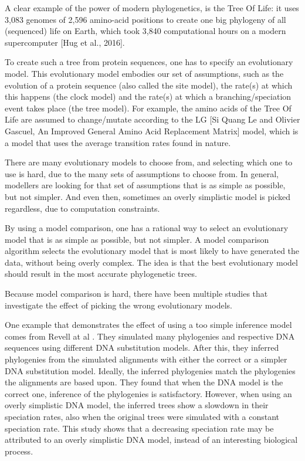 %
%

A clear example of the power of modern phylogenetics,
is the Tree Of Life: it uses 
3,083 genomes of 2,596 amino-acid positions 
to create one big phylogeny of all (sequenced) life on Earth,
which took 3,840 computational hours on a modern supercomputer [Hug et al., 2016].

%
%
%

To create such a tree from protein sequences, one has to specify
an evolutionary model. This evolutionary model embodies our set of
assumptions,
such as the evolution of a protein sequence (also called the site model), 
the rate(s) at which this happens (the clock model) 
and the rate(s) at which a branching/speciation event takes 
place (the tree model). 
For example, the amino acids of the Tree Of Life are assumed to change/mutate
according to the LG [Si Quang 
Le and Olivier Gascuel, An Improved General Amino Acid Replacement Matrix]
model, which is a model that uses the average transition rates found in nature.

There are many evolutionary models to choose from, 
and selecting which one to use is hard, due to the many sets of assumptions
to choose from. In general, modellers are looking for that set of assumptions
that is as simple as possible, but not simpler. And even then, sometimes
an overly simplistic model is picked regardless, due to computation 
constraints. 

By using a model comparison, one has a rational way to select 
an evolutionary model that is as simple as possible, but not simpler.
A model comparison algorithm selects the evolutionary model that is
most likely to have generated the data, without being overly complex.
The idea is that the best evolutionary model should result in the
most accurate phylogenetic trees.

Because model comparison is hard, there have been multiple
studies that investigate the effect of picking the wrong
evolutionary models. 

%
%
%

One example that demonstrates the effect of using a too simple inference model
comes from Revell at al \cite{revell2005under}.
They simulated many phylogenies and respective DNA sequences 
using different DNA substitution models. 
After this, they inferred phylogenies from the simulated alignments
with either the correct or a simpler DNA substitution model. 
Ideally, the inferred phylogenies match the phylogenies the alignments are based upon.
They found that when the DNA model is the correct one, inference of the
phylogenies is satisfactory.
However, when using an overly simplistic DNA model, 
the inferred trees show a slowdown in their speciation rates, 
also when the original trees were simulated with a constant speciation rate.
This study shows that a decreasing speciation rate may be attributed
to an overly simplistic DNA model, instead of an interesting biological process.

